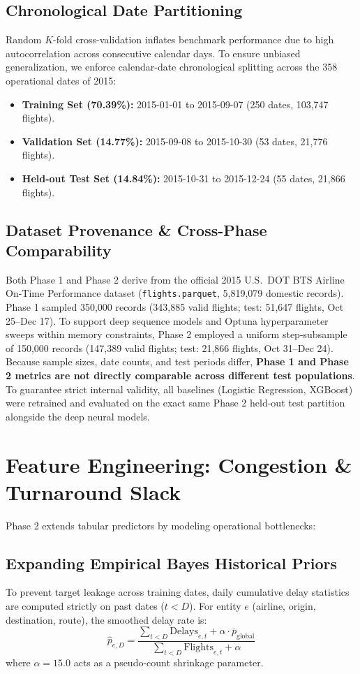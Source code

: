 \documentclass[conference]{IEEEtran}
\begin{document}
\subsection{Chronological Date Partitioning}
Random $K$-fold cross-validation inflates benchmark performance due to high autocorrelation across consecutive calendar days. To ensure unbiased generalization, we enforce calendar-date chronological splitting across the 358 operational dates of 2015:
\begin{itemize}
    \item \textbf{Training Set (70.39\%):} 2015-01-01 to 2015-09-07 (250 dates, 103,747 flights).
    \item \textbf{Validation Set (14.77\%):} 2015-09-08 to 2015-10-30 (53 dates, 21,776 flights).
    \item \textbf{Held-out Test Set (14.84\%):} 2015-10-31 to 2015-12-24 (55 dates, 21,866 flights).
\end{itemize}

\subsection{Dataset Provenance \& Cross-Phase Comparability}
Both Phase 1 and Phase 2 derive from the official 2015 U.S.\ DOT BTS Airline On-Time Performance dataset (\texttt{flights.parquet}, 5,819,079 domestic records). Phase 1 sampled 350,000 records (343,885 valid flights; test: 51,647 flights, Oct 25--Dec 17). To support deep sequence models and Optuna hyperparameter sweeps within memory constraints, Phase 2 employed a uniform step-subsample of 150,000 records (147,389 valid flights; test: 21,866 flights, Oct 31--Dec 24). Because sample sizes, date counts, and test periods differ, \textbf{Phase 1 and Phase 2 metrics are not directly comparable across different test populations}. To guarantee strict internal validity, all baselines (Logistic Regression, XGBoost) were retrained and evaluated on the exact same Phase 2 held-out test partition alongside the deep neural models.

\section{Feature Engineering: Congestion \& Turnaround Slack}
Phase 2 extends tabular predictors by modeling operational bottlenecks:
\subsection{Expanding Empirical Bayes Historical Priors}
To prevent target leakage across training dates, daily cumulative delay statistics are computed strictly on past dates ($t < D$). For entity $e$ (airline, origin, destination, route), the smoothed delay rate is:
\begin{equation}
\hat{p}_{e, D} = \frac{\sum_{t < D} \text{Delays}_{e, t} + \alpha \cdot \bar{p}_{\text{global}}}{\sum_{t < D} \text{Flights}_{e, t} + \alpha}
\end{equation}
where $\alpha = 15.0$ acts as a pseudo-count shrinkage parameter.
\end{document}
